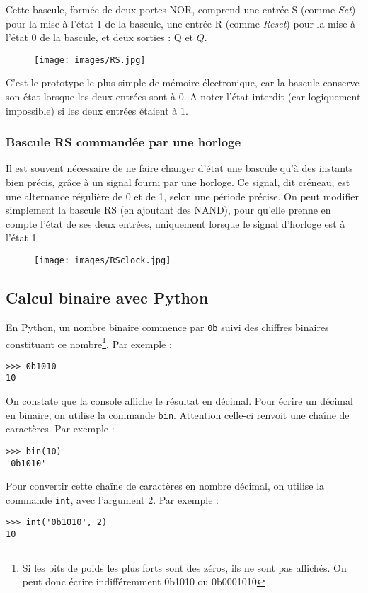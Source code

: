 \documentclass[11pt,a4paper,french,twoside]{PMCours}
\begin{document}
Cette bascule, formée de deux portes NOR, comprend une entrée S (comme \emph{Set}) pour la mise à l'état 1 de la bascule, une entrée R (comme \emph{Reset}) pour la mise à l'état 0 de la bascule, et deux sorties : Q et $\overline{Q}$.
\begin{center}
\begin{figure}[ht]
\centering
\texttt{[image: images/RS.jpg]}
\end{figure}
\end{center}
C'est le prototype le plus simple de mémoire électronique, car la bascule conserve son état lorsque les deux entrées sont à 0. A noter l'état interdit (car logiquement impossible) si les deux entrées étaient à 1.


\subsubsection{Bascule RS commandée par une horloge}

Il est souvent nécessaire de ne faire changer d'état une bascule qu'à des instants bien précis, grâce à un signal fourni par une horloge. Ce signal, dit créneau, est une alternance régulière de 0 et de 1, selon une période précise. On peut modifier simplement la bascule RS (en ajoutant des NAND), pour qu'elle prenne en compte l'état de ses deux entrées, uniquement lorsque le signal d'horloge est à l'état 1. 
\begin{center}
\begin{figure}[ht]
\centering
\texttt{[image: images/RSclock.jpg]}
\end{figure}
\end{center}


\subsection{Calcul binaire avec Python}

En Python, un nombre binaire commence par \verb'0b' suivi des chiffres binaires constituant ce nombre\footnote{Si les bits de poids les plus forts sont des zéros, ils ne sont pas affichés. On peut donc écrire indifféremment 0b1010 ou 0b0001010}. Par exemple : 
\begin{verbatim}
>>> 0b1010
10
\end{verbatim}
On constate que la console affiche le résultat en décimal. Pour écrire un décimal en binaire, on utilise la commande \verb'bin'. Attention celle-ci renvoit une chaîne de caractères. Par exemple : 
\begin{verbatim}
>>> bin(10)
'0b1010'
\end{verbatim}
Pour convertir cette chaîne de caractères en nombre décimal, on utilise la commande \verb'int', avec l'argument 2. Par exemple : 
\begin{verbatim}
>>> int('0b1010', 2)
10
\end{verbatim}
\end{document}
